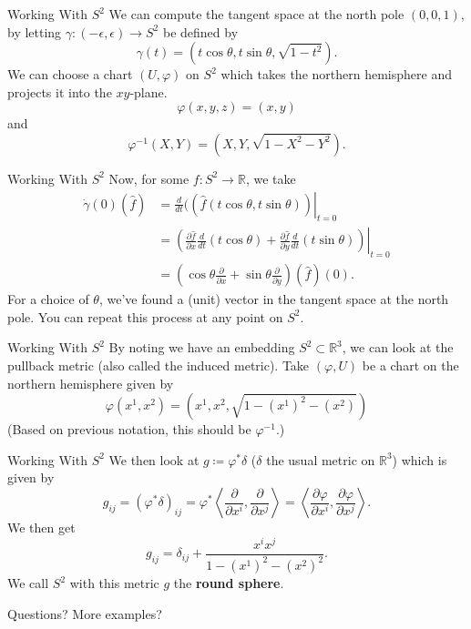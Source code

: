 \documentclass[usenames,dvipsnames]{beamer}
\theoremstyle{definition}
\theoremstyle{theorem}
\newcommand{\R}{\mathbb{R}}
\begin{document}
        \begin{frame}{Working With $S^2$}
            We can compute the tangent space at the north pole $(0,0,1)$, by letting $\gamma \colon (-\epsilon, \epsilon) \to S^2$ be defined by
            \[
            \gamma(t)=(t\cos \theta, t\sin \theta, \sqrt{1-t^2}).
            \]
            We can choose a chart $(U,\varphi)$ on $S^2$ which takes the northern hemisphere and projects it into the $xy$-plane. 
            \[
            \varphi(x,y,z)=(x,y)
            \]
            and
            \[
            \varphi^{-1}(X,Y)=(X,Y,\sqrt{1-X^2-Y^2}).
            \]
        \end{frame}
        
        \begin{frame}{Working With $S^2$}
            Now, for some $f\colon S^2 \to \R$, we take
            \begin{align*}
                \dot{\gamma}(0)(\hat{f})&=\left. \frac{d}{dt}((\hat{f}(t\cos \theta, t \sin \theta))\right|_{t=0}\\
                &= \left.\left(\frac{\partial \hat{f}}{\partial x} \frac{d}{dt}(t\cos \theta) + \frac{\partial \hat{f}}{\partial y}\frac{d}{dt} (t \sin \theta)\right)\right|_{t=0}\\
                &= \left( \cos \theta \frac{\partial}{\partial x}+\sin \theta \frac{\partial}{\partial y}\right)(\hat{f})(0).
            \end{align*}
            For a choice of $\theta$, we've found a (unit) vector in the tangent space at the north pole.  You can repeat this process at any point on $S^2$.
        \end{frame}
        
        \begin{frame}{Working With $S^2$}
            By noting we have an embedding $S^2\subset \R^3$, we can look at the pullback metric (also called the induced metric). Take $(\varphi,U)$ be a chart on the northern hemisphere given by
            \[
            \varphi(x^1,x^2)=\left(x^1,x^2,\sqrt{1-(x^1)^2-(x^2)}\right)
            \]
            (Based on previous notation, this should be $\varphi^{-1}$.)
        \end{frame}
        
        \begin{frame}{Working With $S^2$}
            We then look at $g\coloneqq \varphi^* \delta$ ($\delta$ the usual metric on $\R^3$) which is given by
            \[
            g_{ij}=(\varphi^* \delta)_{ij} = \varphi^*\left\langle \frac{\partial}{\partial x^i}, \frac{\partial}{\partial x^j}\right\rangle =\left\langle \frac{\partial \varphi}{\partial x^i}, \frac{\partial \varphi}{\partial x^j}\right\rangle.
            \]
            We then get
            \[
            g_{ij}=\delta_{ij} + \frac{x^i x^j}{1-(x^1)^2-(x^2)^2}.
            \]
            We call $S^2$ with this metric $g$ the \textbf{round sphere}.
        \end{frame}
        
        \begin{frame}[End]
            Questions? More examples?
        \end{frame}
\end{document}

